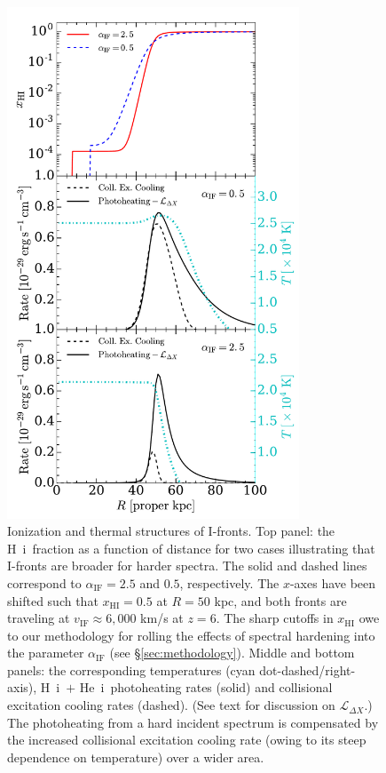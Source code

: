 \documentclass[twocolumn]{aastex62}
\newcommand{\HI}{H{\sc~i}}
\newcommand{\HeI}{He{\sc~i}}
\newcommand{\vIF}{v_{\mathrm{IF}}}
\newcommand{\spec}{\alpha_{\mathrm{IF}}}
\begin{document}
\begin{figure}
\centerline{
\includegraphics[width=8.7cm]{fig3.pdf}
}
\caption{Ionization and thermal structures of I-fronts.  Top panel: the \HI\ fraction as a function of distance for two cases illustrating that I-fronts are broader for harder spectra.   The solid and dashed lines correspond to $\spec = 2.5$ and $0.5$, respectively.    The $x$-axes have been shifted such that $x_{\mathrm{HI}}=0.5$ at $R=50$ kpc, and both fronts are traveling at $\vIF \approx 6,000$ km/s at $z=6$.  The sharp cutoffs in $x_{\mathrm{HI}}$ owe to our methodology for rolling the effects of spectral hardening into the parameter $\spec$ (see \S \ref{sec:methodology}).  Middle and bottom panels:  the corresponding temperatures (cyan dot-dashed/right-axis), \HI\ $+$ \HeI\ photoheating rates (solid) and  collisional excitation cooling rates (dashed).  (See text for discussion on $\mathcal{L}_{\Delta X}$.) The photoheating from a hard incident spectrum is compensated by the increased collisional excitation cooling rate (owing to its steep dependence on temperature) over a wider area. }
\label{fig:I-front_structure}
\end{figure}
\end{document}

